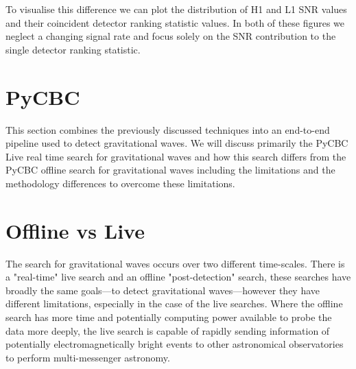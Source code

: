 To visualise this difference we can plot the distribution of H1 and L1 SNR values and their coincident detector ranking statistic values. In both of these figures we neglect a changing signal rate and focus solely on the SNR contribution to the single detector ranking statistic.
%

\section{\label{2:sec:pycbc-live}PyCBC}



%


This section combines the previously discussed techniques into an end-to-end pipeline used to detect gravitational waves. We will discuss primarily the PyCBC Live real time search for gravitational waves and how this search differs from the PyCBC offline search for gravitational waves including the limitations and the methodology differences to overcome these limitations.

\section{\label{2:sec:offline-vs-live}Offline vs Live}

The search for gravitational waves occurs over two different time-scales. There is a "real-time" live search and an offline "post-detection" search, these searches have broadly the same goals---to detect gravitational waves---however they have different limitations, especially in the case of the live searches. Where the offline search has more time and potentially computing power available to probe the data more deeply, the live search is capable of rapidly sending information of potentially electromagnetically bright events to other astronomical observatories to perform multi-messenger astronomy.

